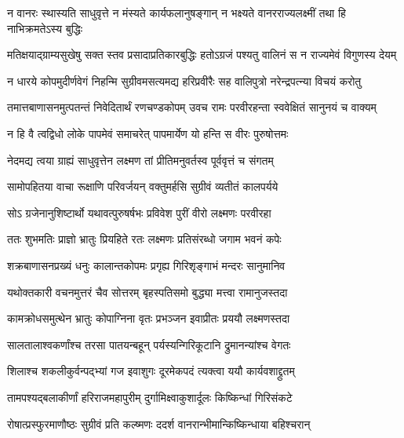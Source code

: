 \fourlineindentedshloka
{न वानरः स्थास्यति साधुवृत्ते}
{ न मंस्यते कार्यफलानुषङ्गान्}
{न भक्ष्यते वानरराज्यलक्ष्मीं}
{ तथा हि नाभिक्रमतेऽस्य बुद्धिः} %

\fourlineindentedshloka
{मतिक्षयाद्ग्राम्यसुखेषु सक्त}
{स्तव प्रसादाप्रतिकारबुद्धिः}
{हतोऽग्रजं पश्यतु वालिनं स}
{ न राज्यमेवं विगुणस्य देयम्} %

\fourlineindentedshloka
{न धारये कोपमुदीर्णवेगं}
{ निहन्मि सुग्रीवमसत्यमद्य}
{हरिप्रवीरैः सह वालिपुत्रो}
{ नरेन्द्रपत्न्या विचयं करोतु} %

\fourlineindentedshloka
{तमात्तबाणासनमुत्पतन्तं}
{ निवेदितार्थं रणचण्डकोपम्}
{उवच रामः परवीरहन्ता}
{ स्ववेक्षितं सानुनयं च वाक्यम्} %

\twolineshloka
{न हि वै त्वद्विधो लोके पापमेवं समाचरेत्}
{पापमार्येण यो हन्ति स वीरः पुरुषोत्तमः} %

\twolineshloka
{नेदमद्य त्वया ग्राह्यं साधुवृत्तेन लक्ष्मण}
{तां प्रीतिमनुवर्तस्व पूर्ववृत्तं च संगतम्} %

\twolineshloka
{सामोपहितया वाचा रूक्षाणि परिवर्जयन्}
{वक्तुमर्हसि सुग्रीवं व्यतीतं कालपर्यये} %

\twolineshloka
{सोऽ ग्रजेनानुशिष्टार्थो यथावत्पुरुषर्षभः}
{प्रविवेश पुरीं वीरो लक्ष्मणः परवीरहा} %

\twolineshloka
{ततः शुभमतिः प्राज्ञो भ्रातुः प्रियहिते रतः}
{लक्ष्मणः प्रतिसंरब्धो जगाम भवनं कपेः} %

\twolineshloka
{शक्रबाणासनप्रख्यं धनुः कालान्तकोपमः}
{प्रगृह्य गिरिशृङ्गाभं मन्दरः सानुमानिव} %

\twolineshloka
{यथोक्तकारी वचनमुत्तरं चैव सोत्तरम्}
{बृहस्पतिसमो बुद्ध्या मत्त्वा रामानुजस्तदा} %

\twolineshloka
{कामक्रोधसमुत्थेन भ्रातुः कोपाग्निना वृतः}
{प्रभञ्जन इवाप्रीतः प्रययौ लक्ष्मणस्तदा} %

\twolineshloka
{सालतालाश्वकर्णांश्च तरसा पातयन्बहून्}
{पर्यस्यन्गिरिकूटानि द्रुमानन्यांश्च वेगतः} %

\twolineshloka
{शिलाश्च शकलीकुर्वन्पद्भ्यां गज इवाशुगः}
{दूरमेकपदं त्यक्त्वा ययौ कार्यवशाद्द्रुतम्} %

\twolineshloka
{तामपश्यद्बलाकीर्णां हरिराजमहापुरीम्}
{दुर्गामिक्ष्वाकुशार्दूलः किष्किन्धां गिरिसंकटे} %

\twolineshloka
{रोषात्प्रस्फुरमाणौष्ठः सुग्रीवं प्रति कल्ष्मणः}
{ददर्श वानरान्भीमान्किष्किन्धाया बहिश्चरान्} %

